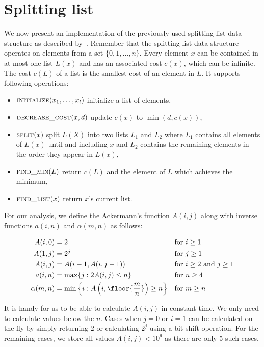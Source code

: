 \section{Splitting list}

We now present an implementation of the previously used splitting list data structure as described by~\cite{gabow1985scaling}. Remember that the splitting list data structure operates on elements from a set $\{0, 1, \dots, n\}$. Every element $x$ can be contained in at most one list $L(x)$ and has an associated cost $c(x)$, which can be infinite. The cost $c(L)$ of a list is the smallest cost of an element in $L$. It supports following operations:

\begin{itemize}
    \item $\textsc{initialize}(x_1, \dots, x_l)$ initialize a list of elements,
    \item $\textsc{decrease\_cost}(x, d)$ update $c(x)$ to $\min(d, c(x))$,
    \item $\textsc{split}(x)$ split $L(X)$ into two lists $L_1$ and $L_2$ where $L_1$ contains all elements of $L(x)$ until and including $x$ and $L_2$ contains the remaining elements in the order they appear in $L(x)$,
    \item $\textsc{find\_min}(L)$ return $c(L)$ and the element of $L$ which achieves the minimum,
    \item $\textsc{find\_list}(x)$ return $x$'s current list.
\end{itemize}

For our analysis, we define the Ackermann's function $A(i,j)$ along with inverse functions $a(i,n)$ and $\alpha(m, n)$ as follows:

\begin{align*}
    A(i,0) &= 2 &&\text{for $i \geq 1$} \\
    A(1,j) &= 2^j &&\text{for $j \geq 1$} \\
    A(i,j) &= A(i-1,A(i, j-1)) &&\text{for $i \geq 2$ and $j \geq 1$} \\
    a(i,n) &= \max \{ j: 2A(i,j) \leq n \} &&\text{for $n \geq 4$} \\
    \alpha(m,n) &= \min \left\{ i: A\left(i,\floor{\frac{m}{n}}\right) \geq n \right\} &&\text{for $m \geq n$}
\end{align*}

It is handy for us to be able to calculate $A(i,j)$ in constant time. We only need to calculate values below the $n$. Cases when $j = 0$ or $i = 1$ can be calculated on the fly by simply returning $2$ or calculating $2^j$ using a bit shift operation. For the remaining cases, we store all values $A(i,j) < 10^9$ as there are only 5 such cases.


